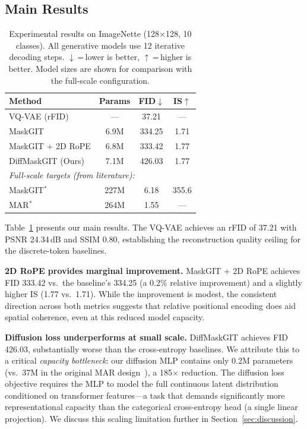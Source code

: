 \documentclass[conference]{IEEEtran}
\begin{document}
\subsection{Main Results}

\begin{table}[!t]
\centering
\caption{Experimental results on ImageNette (128$\times$128, 10 classes). All generative models use 12 iterative decoding steps. $\downarrow$\,=\,lower is better, $\uparrow$\,=\,higher is better. Model sizes are shown for comparison with the full-scale configuration.}
\label{tab:results}
\begin{tabular}{lccc}
\toprule
\textbf{Method} & \textbf{Params} & \textbf{FID}$\downarrow$ & \textbf{IS}$\uparrow$ \\
\midrule
VQ-VAE (rFID) & --- & 37.21 & --- \\
\midrule
MaskGIT & 6.9M & 334.25 & 1.71 \\
MaskGIT + 2D RoPE & 6.8M & 333.42 & 1.77 \\
DiffMaskGIT (Ours) & 7.1M & 426.03 & 1.77 \\
\midrule
\multicolumn{4}{l}{\textit{Full-scale targets (from literature):}} \\
MaskGIT$^*$~\cite{chang2022maskgit} & 227M & 6.18 & 355.6 \\
MAR$^*$~\cite{li2024mar} & 264M & 1.55 & --- \\
\bottomrule
\end{tabular}
\end{table}

Table~\ref{tab:results} presents our main results. The VQ-VAE achieves an rFID of 37.21 with PSNR 24.34\,dB and SSIM 0.80, establishing the reconstruction quality ceiling for the discrete-token baselines.

\textbf{2D RoPE provides marginal improvement.} MaskGIT + 2D RoPE achieves FID 333.42 vs.\ the baseline's 334.25 (a 0.2\% relative improvement) and a slightly higher IS (1.77 vs.\ 1.71). While the improvement is modest, the consistent direction across both metrics suggests that relative positional encoding does aid spatial coherence, even at this reduced model capacity.

\textbf{Diffusion loss underperforms at small scale.} DiffMaskGIT achieves FID 426.03, substantially worse than the cross-entropy baselines. We attribute this to a critical \emph{capacity bottleneck}: our diffusion MLP contains only 0.2M parameters (vs.\ 37M in the original MAR design~\cite{li2024mar}), a 185$\times$ reduction. The diffusion loss objective requires the MLP to model the full continuous latent distribution conditioned on transformer features---a task that demands significantly more representational capacity than the categorical cross-entropy head (a single linear projection). We discuss this scaling limitation further in Section~\ref{sec:discussion}.
\end{document}
